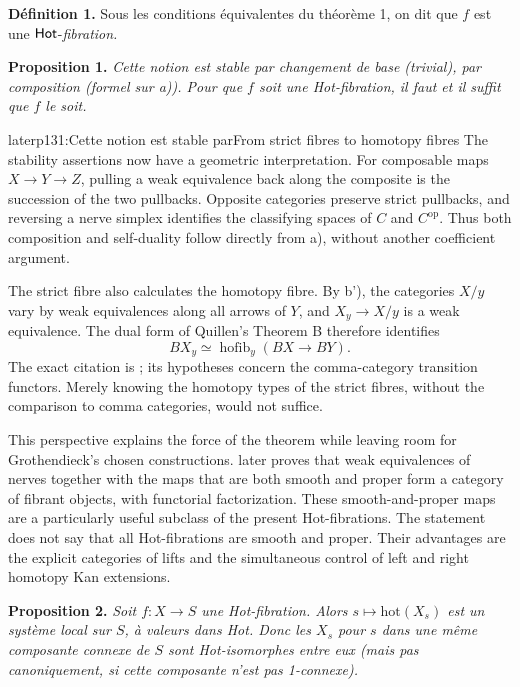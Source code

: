\noindent\textbf{Définition 1.} Sous les conditions équivalentes du théorème 1, on dit que $f$ est une $\mathsf{Hot}$-\textit{fibration.}


\textbf{Proposition 1.} \textit{Cette notion est stable par changement de base (trivial), par composition (formel sur a)). Pour que $f$ soit une \textup{Hot}-fibration, il faut et il suffit que $f$ le soit.}

\begin{dcomment}{later}{p131:Cette notion est stable par}{From strict fibres to homotopy fibres}
The stability assertions now have a geometric interpretation. For composable maps \(X\longrightarrow Y\longrightarrow Z\), pulling a weak equivalence back along the composite is the succession of the two pullbacks. Opposite categories preserve strict pullbacks, and reversing a nerve simplex identifies the classifying spaces of \(C\) and \(C^{\mathrm{op}}\). Thus both composition and self-duality follow directly from a), without another coefficient argument.

The strict fibre also calculates the homotopy fibre. By b'), the categories \(X/y\) vary by weak equivalences along all arrows of \(Y\), and \(X_y\longrightarrow X/y\) is a weak equivalence. The dual form of Quillen's Theorem B therefore identifies
\[
 BX_y \simeq \operatorname{hofib}_y(BX\longrightarrow BY).
\]
The exact citation is \citet[\S1, Theorem B and its corollary]{Quillen1973}; its hypotheses concern the comma-category transition functors. Merely knowing the homotopy types of the strict fibres, without the comparison to comma categories, would not suffice.

This perspective explains the force of the theorem while leaving room for Grothendieck's chosen constructions. \citet[Proposition 4.4]{Cisinski2009LocallyConstant} later proves that weak equivalences of nerves together with the maps that are both smooth and proper form a category of fibrant objects, with functorial factorization. These smooth-and-proper maps are a particularly useful subclass of the present Hot-fibrations. The statement does not say that all Hot-fibrations are smooth and proper. Their advantages are the explicit categories of lifts and the simultaneous control of left and right homotopy Kan extensions.
\end{dcomment}


\textbf{Proposition 2.} \textit{Soit $f : X \longrightarrow S$ une \textup{Hot}-fibration. Alors $s \longmapsto \mathrm{hot}(X_s)$ est un système local sur $S$, à valeurs dans \textup{Hot}. Donc les $X_s$ pour $s$ dans une même composante connexe de $S$ sont \textup{Hot}-isomorphes entre eux (mais pas canoniquement, si cette composante n'est pas \textup{1}-connexe).}

